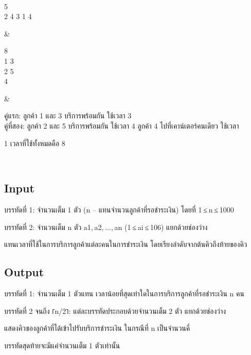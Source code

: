 \documentclass{article}
\begin{document}
{\begin{longtable}[]
\begin{minipage}[t]{\linewidth}
\strut

\end{minipage} \\

\begin{minipage}[t]{\linewidth}\raggedright

5\\

2 4 3 1 4\strut

\end{minipage} & \begin{minipage}[t]{\linewidth}\raggedright

8\\

1 3\\

2 5\\

4\strut

\end{minipage} & \begin{minipage}[t]{\linewidth}\raggedright

คู่แรก: ลูกค้า 1 และ 3 บริการพร้อมกัน ใช้เวลา 3\\

คู่ที่สอง: ลูกค้า 2 และ 5 บริการพร้อมกัน ใช้เวลา 4 ลูกค้า 4 ไปที่เคาน์เตอร์คนเดียว ใช้เวลา

1 เวลาที่ใช้ทั้งหมดคือ 8\\

\strut

\end{minipage} \\

\end{longtable}

}



\subsection*{Input}
บรรทัดที่ 1: จำนวนเต็ม 1 ตัว (n -- แทนจำนวนลูกค้าที่รอชำระเงิน) โดยที่ 1 ≤ n ≤ 1000



บรรทัดที่ 2: จำนวนเต็ม n ตัว a1, a2, ..., an (1 ≤ ai ≤ 106) แยกด้วยช่องว่าง

แทนเวลาที่ใช้ในการบริการลูกค้าแต่ละคนในการชำระเงิน โดยเรียงลำดับจากต้นคิวถึงท้ายของคิว



\subsection*{Output}
บรรทัดที่ 1: จำนวนเต็ม 1 ตัวแทน เวลาน้อยที่สุดเท่าใดในการบริการลูกค้าที่รอชำระเงิน n คน



บรรทัดที่ 2 จนถึง ⌈n/2⌉: แต่ละบรรทัดประกอบด้วยจำนวนเต็ม 2 ตัว แยกด้วยช่องว่าง

แสดงคิวของลูกค้าที่ได้เข้าไปรับบริการชำระเงิน ในกรณีที่ n เป็นจำนวนคี่

บรรทัดสุดท้ายจะมีแค่จำนวนเต็ม 1 ตัวเท่านั้น
\end{document}

